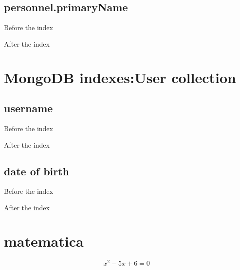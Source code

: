 \begin{alphasection}
\subsection{personnel.primaryName}
Before the index

After the index

\section{MongoDB indexes:User collection}
\subsection{username}
Before the index

After the index

\subsection{date of birth}
Before the index

After the index


\section{matematica}\label{eq:pippo}
\begin{equation}\label{pippo}
x^2-5x+6=0
\end{equation}
\end{alphasection}

